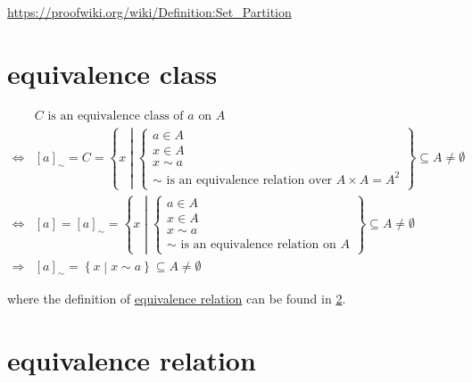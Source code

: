 \documentclass[
]{book}
\theoremstyle{definition}
\theoremstyle{definition}
\theoremstyle{definition}
\theoremstyle{definition}
\theoremstyle{remark}
\begin{document}
\url{https://proofwiki.org/wiki/Definition:Set_Partition}

\chapter{equivalence class}\label{equivalence-class}

\begin{align*}
 & C\text{ is an equivalence class of }a\text{ on }A\\
\Leftrightarrow & \left[a\right]_{\sim}=C=\left\{ x\middle|\begin{cases}
a\in A\\
x\in A\\
x\sim a\\
\sim\text{ is an equivalence relation over }A\times A=A^{2}
\end{cases}\right\} \subseteq A\ne\emptyset\\
\Leftrightarrow & \left[a\right]=\left[a\right]_{\sim}=\left\{ x\middle|\begin{cases}
a\in A\\
x\in A\\
x\sim a\\
\sim\text{ is an equivalence relation on }A
\end{cases}\right\} \subseteq A\ne\emptyset\\
\Rightarrow & \left[a\right]_{\sim}=\left\{ x\middle|x\sim a\right\} \subseteq A\ne\emptyset
\end{align*}

where the definition of \hyperref[equivalence-relation]{equivalence relation} can be found in \ref{equivalence-relation}.

\chapter{equivalence relation}\label{equivalence-relation}
\end{document}
